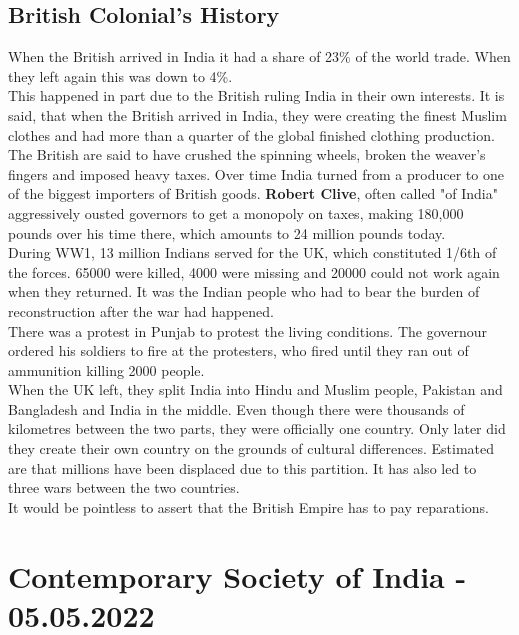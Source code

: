 \documentclass{article}
\begin{document}
	\subsection{British Colonial's History}
	When the British arrived in India it had a share of 23\% of the world trade. When they left again this was down to 4\%. \\
	This happened in part due to the British ruling India in their own interests. It is said, that when the British arrived in India, they were creating the finest Muslim clothes and had more than a quarter of the global finished clothing production. The British are said to have crushed the spinning wheels, broken the weaver's fingers and imposed heavy taxes. Over time India turned from a producer to one of the biggest importers of British goods. \textbf{Robert Clive}, often called "of India" aggressively ousted governors to get a monopoly on taxes, making 180,000 pounds over his time there, which amounts to 24 million pounds today. \\
	During WW1, 13 million Indians served for the UK, which constituted 1/6th of the forces. 65000 were killed, 4000 were missing and 20000 could not work again when they returned. It was the Indian people who had to bear the burden of reconstruction after the war had happened. \\
	There was a protest in Punjab to protest the living conditions. The governour ordered his soldiers to fire at the protesters, who fired until they ran out of ammunition killing 2000 people. \\
	When the UK left, they split India into Hindu and Muslim people, Pakistan and Bangladesh and India in the middle. Even though there were thousands of kilometres between the two parts, they were officially one country. Only later did they create their own country on the grounds of cultural differences. Estimated are that millions have been displaced due to this partition. It has also led to three wars between the two countries. \\
	It would be pointless to assert that the British Empire has to pay reparations. \\

	\section{Contemporary Society of India - 05.05.2022}
\end{document}
